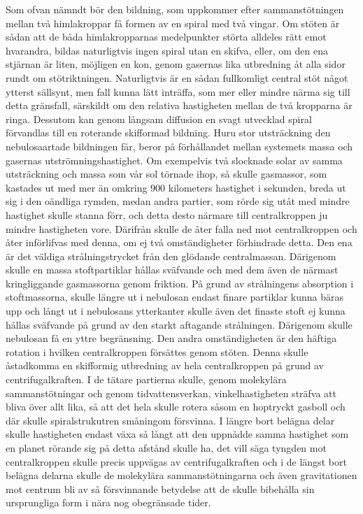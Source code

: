 \documentclass[a4paper, 12pt, oneside, swedish]{article}
\begin{document}
Som ofvan nämndt bör den bildning, som uppkommer efter sammanstötningen mellan två himlakroppar få formen av en spiral med två vingar. Om stöten är sådan att de båda himlakropparnas medelpunkter störta alldeles rätt emot hvarandra, bildas naturligtvis ingen spiral utan en skifva, eller, om den ena stjärnan är liten, möjligen en kon, genom gasernas lika utbredning åt alla sidor rundt om stötriktningen. Naturligtvis är en sådan fullkomligt central stöt något ytterst sällsynt, men fall kunna lätt inträffa, som mer eller mindre närma sig till detta gränsfall, särskildt om den relativa hastigheten mellan de två kropparna är ringa. Dessutom kan genom långsam diffusion en svagt utvecklad spiral förvandlas till en roterande skifformad bildning. Huru stor utsträckning den nebulosaartade bildningen får, beror på förhållandet mellan systemets massa och gasernas utströmningshastighet. Om exempelvis två slocknade solar av samma utsträckning och massa som vår sol törnade ihop, så skulle gasmassor, som kastades ut med mer än omkring 900 kilometers hastighet i sekunden, breda ut sig i den oändliga rymden, medan andra partier, som rörde sig utåt med mindre hastighet skulle stanna förr, och detta desto närmare till centralkroppen ju mindre hastigheten vore. Därifrån skulle de åter falla ned mot centralkroppen och åter införlifvas med denna, om ej två omständigheter förhindrade detta. Den ena är det väldiga strålningstrycket från den glödande centralmassan. Därigenom skulle en massa stoftpartiklar hållas sväfvande och med dem även de närmast kringliggande gasmassorna genom friktion. På grund av strålningens absorption i stoftmassorna, skulle längre ut i nebulosan endast finare partiklar kunna bäras upp och långt ut i nebulosans ytterkanter skulle även det finaste stoft ej kunna hållas sväfvande på grund av den starkt aftagande strålningen. Därigenom skulle nebulosan få en yttre begränsning. Den andra omständigheten är den häftiga rotation i hvilken centralkroppen försättes genom stöten. Denna skulle åstadkomma en skifformig utbredning av hela centralkroppen på grund av centrifugalkraften. I de tätare partierna skulle, genom molekylära sammanstötningar och genom tidvattensverkan, vinkelhastigheten sträfva att bliva över allt lika, så att det hela skulle rotera såsom en hoptryckt gasboll och där skulle spiralstrukutren småningom försvinna. I längre bort belägna delar skulle hastigheten endast växa så långt att den uppnådde samma hastighet som en planet rörande sig på detta afstånd skulle ha, det vill säga tyngden mot centralkroppen skulle precis uppvägas av centrifugalkraften och i de längst bort belägna delarna skulle de molekylära sammanstötningarna och även gravitationen mot centrum bli av så försvinnande betydelse att de skulle bibehålla sin ursprungliga form i nära nog obegränsade tider.
\end{document}
